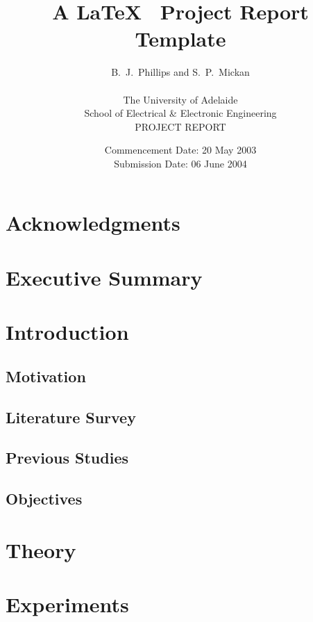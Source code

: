 \documentclass[a4paper,12pt]{article}
\title{A \LaTeX~ Project Report Template}
\author{B.~J.~Phillips and S.~P.~Mickan\\
\\
The University of Adelaide\\
School of Electrical \& Electronic Engineering\\
PROJECT REPORT}
\date{Commencement Date: 20 May 2003\\
Submission Date: 06 June 2004}
\begin{document}
\maketitle

\newpage
\section*{Acknowledgments}


\newpage
\section*{Executive Summary}


\newpage

\tableofcontents

\newpage
\section{Introduction}


\subsection{Motivation}


\subsection{Literature Survey}


\subsection{Previous Studies}


\subsection{Objectives}


\section{Theory}


\section{Experiments}

\end{document}
